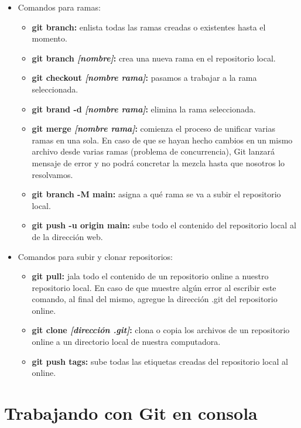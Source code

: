 \begin{itemize}
    \item Comandos para ramas:
    \begin{itemize}
        \item \textbf{git branch:} enlista todas las ramas creadas o existentes hasta el momento.
        \item \textbf{git branch \textit{[nombre]}:} crea una nueva rama en el repositorio local.
        \item \textbf{git checkout \textit{[nombre rama]}:} pasamos a trabajar a la rama seleccionada.
        \item \textbf{git brand -d \textit{[nombre rama]}:} elimina la rama seleccionada.
        \item \textbf{git merge \textit{[nombre rama]}:} comienza el proceso de unificar varias ramas en una sola. En caso de que se hayan hecho cambios en un mismo archivo desde varias ramas (problema de concurrencia), Git lanzará mensaje de error y no podrá concretar la mezcla hasta que nosotros lo resolvamos.
        \item \textbf{git branch -M main: }asigna a qué rama se va a subir el repositorio local.
        \item \textbf{git push -u origin main:} sube todo el contenido del repositorio local al de la dirección web.
    \end{itemize}
    \item Comandos para subir y clonar repositorios:
    \begin{itemize}
        \item \textbf{git pull: }jala todo el contenido de un repositorio online a nuestro repositorio local. En caso de que muestre algún error al escribir este comando, al final del mismo, agregue la dirección .git del repositorio online.
        \item \textbf{git clone \textit{[dirección .git]}:} clona o copia los archivos de un repositorio online a un directorio local de nuestra computadora.
        \item \textbf{git push tags: }sube todas las etiquetas creadas del repositorio local al online.
    \end{itemize}
\end{itemize}



\section{Trabajando con Git en consola}

